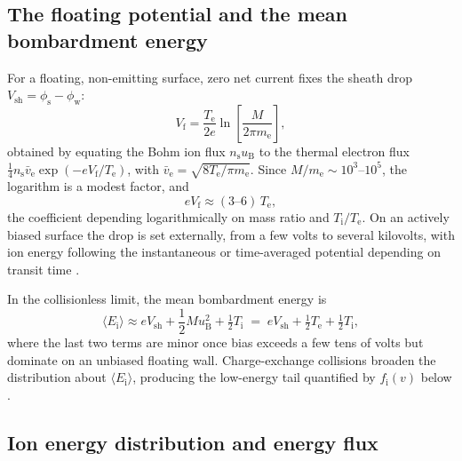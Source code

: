 \subsection{The floating potential and the mean bombardment energy}

For a floating, non-emitting surface, zero net current fixes the sheath drop $V_{\mathrm{sh}} = \phi_{\mathrm{s}} - \phi_{\mathrm{w}}$:
\begin{equation}
V_{\mathrm{f}} = \frac{T_{\mathrm{e}}}{2e}\ln\!\left[\frac{M}{2\pi m_{\mathrm{e}}}\right],
\label{eq:floating}
\end{equation}
obtained by equating the Bohm ion flux $n_{\mathrm{s}} u_{\mathrm{B}}$ to the thermal electron flux $\tfrac{1}{4} n_{\mathrm{s}} \bar v_{\mathrm{e}} \exp(-eV_{\mathrm{f}}/T_{\mathrm{e}})$, with $\bar v_{\mathrm{e}} = \sqrt{8 T_{\mathrm{e}}/\pi m_{\mathrm{e}}}$. Since $M/m_{\mathrm{e}}\sim10^{3}$--$10^{5}$, the logarithm is a modest factor, and
\begin{equation}
e V_{\mathrm{f}} \approx (3\text{--}6)\, T_{\mathrm{e}},
\end{equation}
the coefficient depending logarithmically on mass ratio and $T_{\mathrm{i}}/T_{\mathrm{e}}$. On an actively biased surface the drop is set externally, from a few volts to several kilovolts, with ion energy following the instantaneous or time-averaged potential depending on transit time \cite{ref0080,ref0105}.

In the collisionless limit, the mean bombardment energy is
\begin{equation}
\langle E_{\mathrm{i}} \rangle \approx e V_{\mathrm{sh}} + \frac{1}{2}M u_{\mathrm{B}}^{2} + \tfrac{1}{2}T_{\mathrm{i}}
\;=\; e V_{\mathrm{sh}} + \tfrac{1}{2}T_{\mathrm{e}} + \tfrac{1}{2}T_{\mathrm{i}},
\label{eq:meanenergy}
\end{equation}
where the last two terms are minor once bias exceeds a few tens of volts but dominate on an unbiased floating wall. Charge-exchange collisions broaden the distribution about $\langle E_{\mathrm{i}}\rangle$, producing the low-energy tail quantified by $f_{\mathrm{i}}(v)$ below \cite{ref0077}.

\subsection{Ion energy distribution and energy flux}

